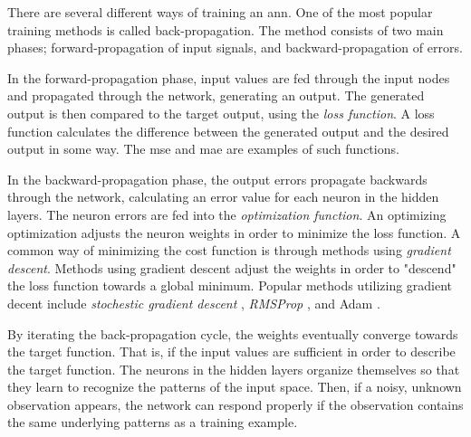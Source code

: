 There are several different ways of training an \gls{ann}. One of the most popular training methods is called back-propagation. The method consists of two main phases; forward-propagation of input signals, and backward-propagation of errors.

In the forward-propagation phase, input values are fed through the input nodes and propagated through the network, generating an output. The generated output is then compared to the target output, using the \textit{loss function}. A loss function calculates the difference between the generated output and the desired output in some way. The \gls{mse} and \gls{mae} are examples of such functions.

In the backward-propagation phase, the output errors propagate backwards through the network, calculating an error value for each neuron in the hidden layers. The neuron errors are fed into the \textit{optimization function}. An optimizing optimization adjusts the neuron weights in order to minimize the loss function. A common way of minimizing the cost function is through methods using \textit{gradient descent}. Methods using gradient descent adjust the weights in order to "descend" the loss function towards a global minimum. Popular methods utilizing gradient decent include \textit{stochestic gradient descent} \citep{bib:bottou-98x}, \textit{RMSProp} \citep{bib:hinton2012neural}, and Adam \citep{bib:KingmaB14}. 

By iterating the back-propagation cycle, the weights eventually converge towards the target function. That is, if the input values are sufficient in order to describe the target function. The neurons in the hidden layers organize themselves so that they learn to recognize the patterns of the input space. Then, if a noisy, unknown observation appears, the network can respond properly if the observation contains the same underlying patterns as a training example.